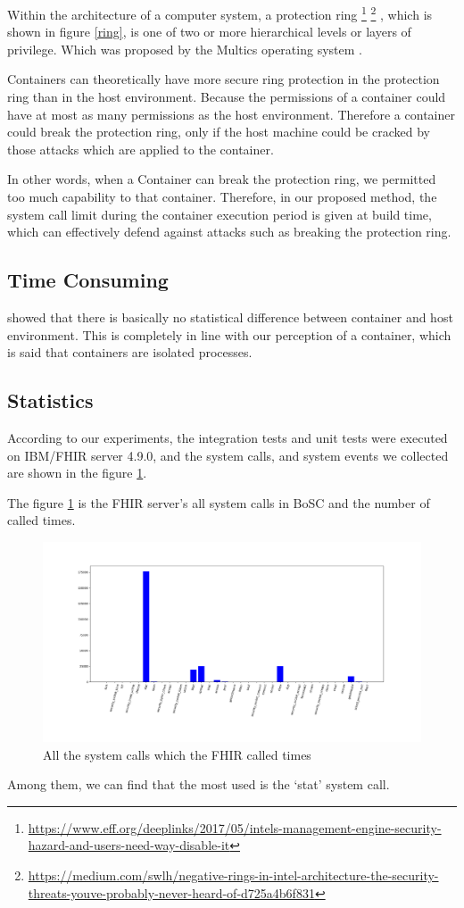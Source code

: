 Within the architecture of a computer system, a protection ring
\footnote{\url{https://www.eff.org/deeplinks/2017/05/intels-management-engine-security-hazard-and-users-need-way-disable-it}}
\footnote{\url{https://medium.com/swlh/negative-rings-in-intel-architecture-the-security-threats-youve-probably-never-heard-of-d725a4b6f831}}
, which is shown in figure \ref{ring}, is one of two or more
hierarchical levels or layers of privilege. Which was proposed by the Multics 
operating system \cite{6234805}.

Containers can theoretically have more secure ring protection in the
protection ring than in the host environment. Because the permissions
of a container could have at most as many permissions as the host environment.
Therefore a container could break the protection ring, only if the host
machine could be cracked by those attacks which are applied to the container.

In other words, when a Container can break the protection ring, we permitted
too much capability to that container. Therefore, in our proposed method, the
system call limit during the container execution period is given at build time,
which can effectively defend against attacks such as breaking the protection ring.

\subsection{Time Consuming}
\textcite{KOZHIRBAYEV2017175} showed that there is basically no
statistical difference between container and host environment.
This is completely in line with our perception of a container, 
which is said that containers are isolated processes.

\subsection{Statistics}
According to our experiments, the integration tests and unit
tests were executed on IBM/FHIR server 4.9.0, and the system calls,
and system events we collected are shown in the figure \ref{hist}.

The figure \ref{hist} is the FHIR server's all system calls in
BoSC\cite{1495942} and the number of called times.
\begin{figure}
    \centering
    \includegraphics[width=\textwidth]{src/hist.png}
    \caption{All the system calls which the FHIR called times}
    \label{hist}
\end{figure}
Among them, we can find that the most used is the `stat' system call.


